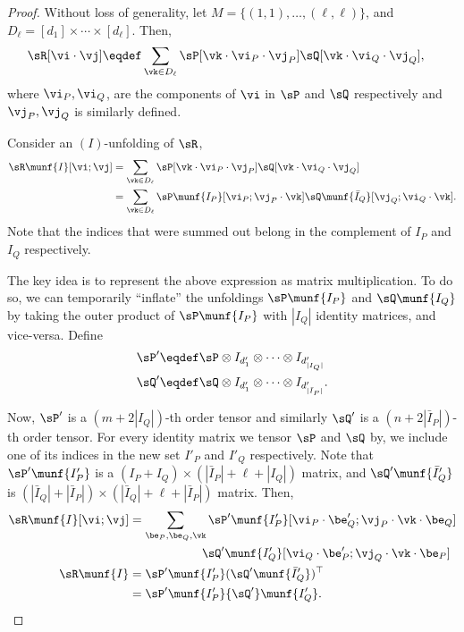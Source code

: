 \begin{proof}
  Without loss of generality, let $M = \{(1,1), \ldots, (\ell,\ell)\}$,
  and $D_\ell = [d_1] \times \cdots \times [d_\ell]$. 
  Then, 
  \begin{align*}
    \sR[\vi\cdot\vj] &\eqdef \sum_{\vk \in D_\ell} \sP[\vk\cdot\vi_P\cdot\vj_P] \sQ[\vk\cdot\vi_Q\cdot\vj_Q],
  \end{align*}
  where $\vi_P, \vi_Q$, are the components of $\vi$ in $\sP$ and $\sQ$
  respectively and $\vj_P, \vj_Q$ is similarly defined.

Consider an $(I)$-unfolding of $\sR$,
  \begin{align*}
    \sR\munf{I}[\vi;\vj] 
       &= \sum_{\vk \in D_\ell} \sP[\vk\cdot \vi_P \cdot \vj_P] \sQ[\vk\cdot \vi_Q \cdot \vj_Q] \\
       &= \sum_{\vk \in D_\ell} \sP\munf{I_P}[\vi_P; \vj_P \cdot \vk] \sQ\munf{\bar I_Q}[\vj_Q ; \vi_Q \cdot \vk].
  \end{align*}
Note that the indices that were summed out belong in the complement of
$I_P$ and $I_Q$ respectively.

The key idea is to represent the above expression as matrix multiplication.
To do so, we can temporarily ``inflate'' the unfoldings $\sP\munf{I_P}$
  and $\sQ\munf{I_Q}$ by taking the outer product of $\sP\munf{I_P}$ with
  $|I_Q|$ identity matrices, and vice-versa. Define 
\begin{align*}
  \sP' &\eqdef \sP \otimes I_{d'_1} \otimes \cdots \otimes I_{d'_{|I_Q|}} \\
  \sQ' &\eqdef \sQ \otimes I_{d'_1} \otimes \cdots \otimes I_{d'_{|\bar I_P|}}.
\end{align*}

Now, $\sP'$ is a $(m + 2 |I_Q|)$-th order tensor and similarly $\sQ'$
  is a $(n + 2 |\bar I_P|)$-th order tensor. 
For every identity matrix we tensor $\sP$ and $\sQ$ by, we include one of
  its indices in the new set $I'_P$ and $I'_Q$ respectively.
Note that ${\sP'}\munf{I'_P}$ is a $(I_P + I_Q)\times (|\bar I_P| + \ell
  + |I_Q|)$ matrix, and ${\sQ'}\munf{\bar I'_Q}$ is $(|\bar I_Q| + |\bar
  I_P|) \times (|\bar I_Q| + \ell + |\bar I_P|)$ matrix.
Then,
\begin{align*}
    \sR\munf{I}[\vi;\vj] 
    &= \sum_{\be_P, \be_Q, \vk}
    {\sP'}\munf{I'_P}[\vi_P \cdot \be'_Q; \vj_P \cdot \vk \cdot \be_Q ]  \\ 
    &\quad \hphantom{\sum_{\be_P, \be_Q, \vk}}
    {\sQ'}\munf{I'_Q}[\vi_Q \cdot \be'_P; \vj_Q \cdot \vk \cdot \be_P ] \\
    \sR\munf{I} &= {\sP'}\munf{I'_P} ({\sQ'}\munf{\bar I'_Q})^\top \\
                &= {\sP'}\munf{I'_P} {\sQ'}\munf{I'_Q}.
\end{align*}


\end{proof}
